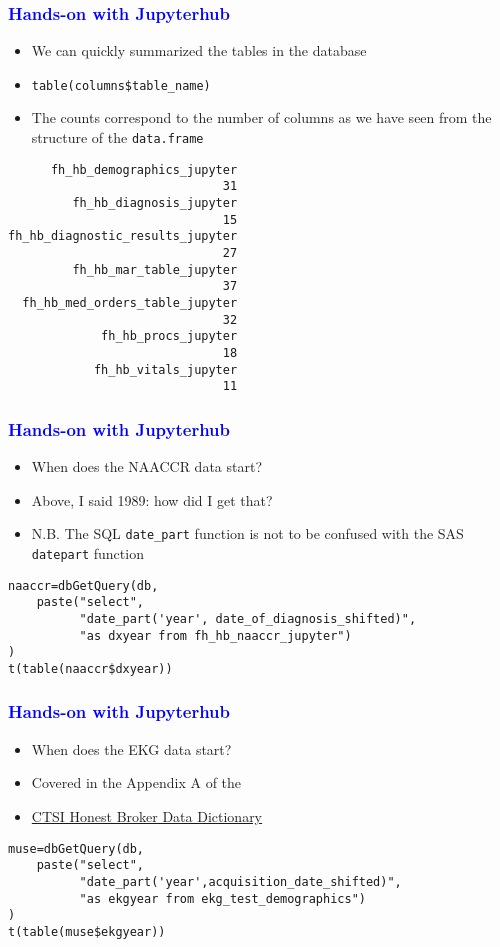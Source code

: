 \documentclass[11pt,pdftex,dvipsnames,usenames]{beamer}
\begin{document}
\begin{frame}[fragile]\frametitle{\bf\textcolor{blue}{Hands-on with Jupyterhub}}
\begin{itemize}
\item We can quickly summarized the tables in the database
\item \texttt{table(columns\$table\_name)}
\item The counts correspond to the number of columns as we have seen from the structure of the \texttt{data.frame}
\end{itemize}
\begin{verbatim}
      fh_hb_demographics_jupyter          
                              31
         fh_hb_diagnosis_jupyter 
                              15 
fh_hb_diagnostic_results_jupyter
                              27
         fh_hb_mar_table_jupyter
                              37
  fh_hb_med_orders_table_jupyter 
                              32 
             fh_hb_procs_jupyter
                              18 
            fh_hb_vitals_jupyter 
                              11 
\end{verbatim}
\end{frame}

\begin{frame}[fragile]\frametitle{\bf\textcolor{blue}{Hands-on with Jupyterhub}}
\begin{itemize}
\item When does the NAACCR data start?
\item Above, I said 1989: how did I get that?
\item N.B. The SQL \texttt{date\_part} function is not to be confused with 
the SAS \texttt{datepart} function
\end{itemize}
\begin{verbatim}
naaccr=dbGetQuery(db, 
    paste("select",
          "date_part('year', date_of_diagnosis_shifted)",
          "as dxyear from fh_hb_naaccr_jupyter")
)
t(table(naaccr$dxyear))
\end{verbatim}
\end{frame}

\begin{frame}[fragile]\frametitle{\bf\textcolor{blue}{Hands-on with Jupyterhub}}
\begin{itemize}
\item When does the EKG data start?
\item Covered in the Appendix A of the 
\item \href{https://ctri.mcw.edu/wp-content/uploads/CTSI-Honest-Broker-Data-Dictionary.pdf}{CTSI Honest Broker Data Dictionary}
\end{itemize}
\begin{verbatim}
muse=dbGetQuery(db, 
    paste("select",
          "date_part('year',acquisition_date_shifted)",
          "as ekgyear from ekg_test_demographics")
)
t(table(muse$ekgyear))
\end{verbatim}
\end{frame}
\end{document}
